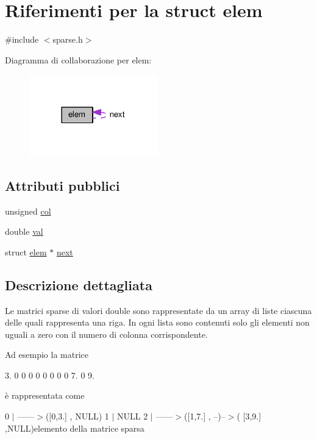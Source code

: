 \hypertarget{structelem}{}\section{Riferimenti per la struct elem}
\label{structelem}


{\ttfamily \#include $<$sparse.\+h$>$}



Diagramma di collaborazione per elem\+:
\nopagebreak
\begin{figure}[H]
\begin{center}
\leavevmode
\includegraphics[width=158pt]{structelem__coll__graph}
\end{center}
\end{figure}
\subsection*{Attributi pubblici}
\begin{DoxyCompactItemize}
\item 
unsigned \hyperlink{structelem_aca409f3a7c1c9621b262a230c78ef37b}{col}
\item 
double \hyperlink{structelem_a52a0b099052bdf7611aa32acdb3f5449}{val}
\item 
struct \hyperlink{structelem}{elem} $\ast$ \hyperlink{structelem_ab9cf5c2e1c9a0ec2938275b90d39d5ca}{next}
\end{DoxyCompactItemize}


\subsection{Descrizione dettagliata}
Le matrici sparse di valori double sono rappresentate da un array di liste ciascuna delle quali rappresenta una riga. In ogni lista sono contenuti solo gli elementi non uguali a zero con il numero di colonna corrispondente.

Ad esempio la matrice

3. 0 0 0 0 0 0 0 0 7. 0 9.

è rappresentata come

0 $\vert$ ------$>$(\mbox{[}0,3.\mbox{]} , N\+U\+LL) 1 $\vert$ N\+U\+LL 2 $\vert$ ------$>$(\mbox{[}1,7.\mbox{]} , --)--$>$( \mbox{[}3,9.\mbox{]} ,N\+U\+LL)elemento della matrice sparsa 

